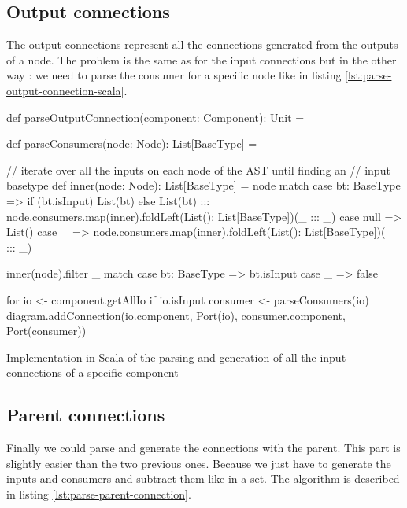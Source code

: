 \subsection{Output connections}
\label{sec:output-connections}

The output connections represent all the connections generated from the outputs
of a node. The problem is the same as for the input connections but in the other
way : we need to parse the consumer for a specific node like in listing
\ref{lst:parse-output-connection-scala}.

\begin{listing}[H]
  \centering
  \begin{scalacode}
  def parseOutputConnection(component: Component): Unit = {
      
    def parseConsumers(node: Node): List[BaseType] = {
      
      // iterate over all the inputs on each node of the AST until finding an
      // input basetype
      def inner(node: Node): List[BaseType] = node match {
        case bt: BaseType =>
          if (bt.isInput) List(bt)
          else List(bt) ::: node.consumers.map(inner).foldLeft(List(): List[BaseType])(_ ::: _)
        case null => List()
        case _ => node.consumers.map(inner).foldLeft(List(): List[BaseType])(_ ::: _)
      }

      inner(node).filter {
        _ match {
          case bt: BaseType => bt.isInput
          case _ => false
        }
      }
    }

    for {
      io <- component.getAllIo
      if io.isInput
      consumer <- parseConsumers(io)
    } {
      diagram.addConnection(io.component, Port(io), consumer.component, Port(consumer))
    }
  }
  \end{scalacode}
  \caption[Parsing and generation of the outputs connections]{Implementation in
    Scala of the parsing and generation of all the input connections of a
    specific component}
  \label{lst:parse-output-connection-scala}
\end{listing}

\subsection{Parent connections}
\label{sec:parent-connections}

Finally we could parse and generate the connections with the parent. This part
is slightly easier than the two previous ones. Because we just have to generate
the inputs and consumers and subtract them like in a set. The algorithm is
described in listing \ref{lst:parse-parent-connection}.

